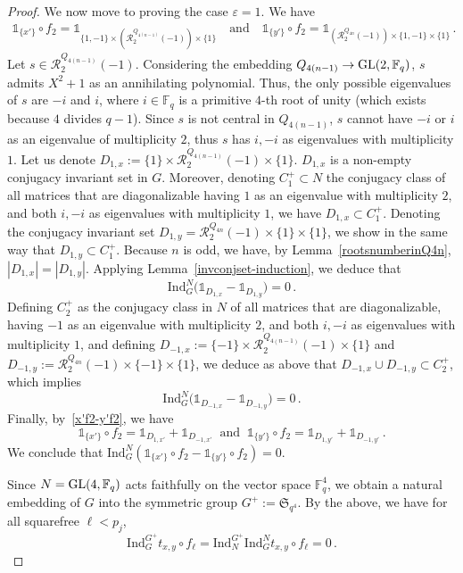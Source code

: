 \documentclass[12pt]{amsart}
\numberwithin{equation}{section}
\newcommand{\GL}{{\rm GL}}
\newcommand{\F}{\mathbb F}
\theoremstyle{definition}
\theoremstyle{remark}
\begin{document}
\begin{proof}
    We now move to proving the case $\varepsilon=1$. We have \begin{align}\label{x'f2-y'f2}
        \mathds{1}_{\{x'\}}\circ f_2=\mathds{1}_{ \{1,-1\}\times \left(\mathcal{R}_2^{Q_{4(n-1)}}(-1)\right)\times\{1\} }\quad\text{and}\quad
        \mathds{1}_{\{y'\}}\circ f_2=\mathds{1}_{ \left(\mathcal{R}_2^{Q_{4n}}(-1)\right)\times \{1,-1\}\times\{1\} }\, .
    \end{align}
    Let $s\in \mathcal{R}_2^{Q_{4(n-1)}}(-1)$. Considering the embedding $Q_{4(n-1)} \to \GL(2,\F_q)$, $s$ admits $X^2+1$ as an annihilating polynomial. Thus, the only possible eigenvalues of $s$ are $-i$ and $i$, where $i\in \F_q$ is a primitive $4$-th root of unity (which exists because $4$ divides $q-1$). Since $s$ is not central in $Q_{4(n-1)}$, $s$ cannot have $-i$ or $i$ as an eigenvalue of multiplicity $2$, thus $s$ has $i,-i$ as eigenvalues with multiplicity $1$. Let us denote $D_{1,x}:=\{1\}\times \mathcal{R}_2^{Q_{4(n-1)}}(-1)\times \{1\}$. $D_{1,x}$ is a non-empty conjugacy invariant set in $G$. Moreover, denoting $C_1^+\subset N$ the conjugacy class of all matrices that are diagonalizable having $1$ as an eigenvalue with multiplicity $2$, and both $i,-i$ as eigenvalues with multiplicity $1$, we have $D_{1,x}\subset C_1^{+}$. Denoting the conjugacy invariant set $D_{1,y}=\mathcal{R}_2^{Q_{4n}}(-1)\times \{1\}\times\{1\}$, we show in the same way that $D_{1,y}\subset C_1^+$. Because $n$ is odd, we have, by Lemma~\ref{rootsnumberinQ4n}, $|D_{1,x}|=|D_{1,y}|$. Applying Lemma~\ref{invconjset-induction}, we deduce that \[ \mathrm{Ind}_G^N \bigl( \mathds{1}_{D_{1,x}}-\mathds{1}_{D_{1,y}}\bigr)=0\, .\]
    Defining $C_2^+$ as the conjugacy class in $N$ of all matrices that are diagonalizable, having $-1$ as an eigenvalue with multiplicity $2$, and both $i,-i$ as eigenvalues with multiplicity $1$, and defining $D_{-1,x}:=\{-1\}\times \mathcal{R}_2^{Q_{4(n-1)}}(-1)\times \{1\}$ and $D_{-1,y}:=\mathcal{R}_2^{Q_{4n}}(-1)\times \{-1\}\times\{1\}$, we deduce as above that $D_{-1,x}\cup D_{-1,y}\subset C_2^+$, which implies  \[ \mathrm{Ind}_G^N \bigl( \mathds{1}_{D_{-1,x}}-\mathds{1}_{D_{-1,y}}\bigr)=0\, .\]
    Finally, by~\eqref{x'f2-y'f2}, we have \[\mathds{1}_{\{x'\}}\circ f_2=\mathds{1}_{D_{1,x'}}+\mathds{1}_{D_{-1,x'}}\ \text{ and }\ \mathds{1}_{\{y'\}}\circ f_2=\mathds{1}_{D_{1,y'}}+\mathds{1}_{D_{-1,y'}} \, .\]
    We conclude that $\mathrm{Ind}_G^N (\mathds{1}_{\{x'\}}\circ f_2-\mathds{1}_{\{y'\}}\circ f_2)=0$.

    Since $N=\GL(4, \F_q)$ acts faithfully on the vector space $\F_q^4$, we obtain a natural embedding of $G$ into the symmetric group $G^+:=\mathfrak{S}_{q^4}$. By the above, we have for all squarefree $\ell<p_j$, \[\mathrm{Ind}_G^{G^+} t_{x,y}\circ f_\ell=\mathrm{Ind}_N^{G^+}\mathrm{Ind}_G^N t_{x,y}\circ f_\ell=0\, .\]


\end{proof}
\end{document}
